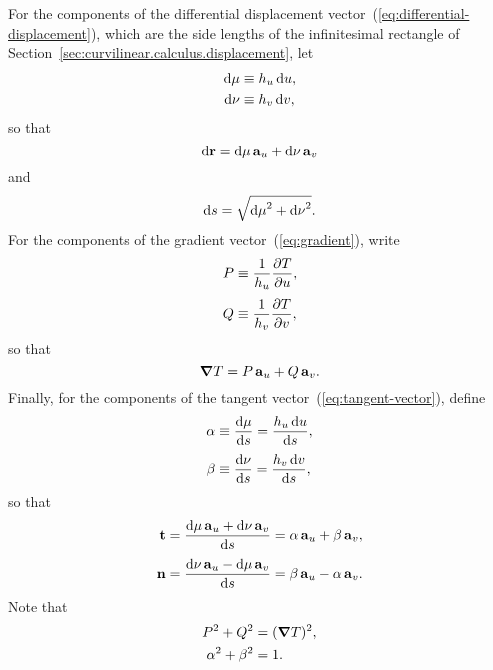 For the components of the differential displacement
vector~(\ref{eq:differential-displacement}),
which are the side lengths of the infinitesimal rectangle
of Section~\ref{sec:curvilinear.calculus.displacement},
let
\begin{align}
  \td \mu &\defeq \scalefac[u] \td u,
    \label{eq:differential-displacement-u-component} \\
  \td \nu &\defeq \scalefac[v] \td v,
    \label{eq:differential-displacement-v-component}
\end{align}
so that
\begin{equation}
  \mathop{}\!\mathrm{d} \boldsymbol{\mathrm{r}} = \mathop{}\!\mathrm{d} \mu \mathop{}\!\boldsymbol{\mathrm{a}}_{u} + \mathop{}\!\mathrm{d} \nu \mathop{}\!\boldsymbol{\mathrm{a}}_{v}
  \label{eq:differential-displacement-abbreviated}
\end{equation}
and
\begin{equation}
  \mathop{}\!\mathrm{d} s = \sqrt{{\mathop{}\!\mathrm{d} \mu}^2 + {\mathop{}\!\mathrm{d} \nu}^2}.
  \label{eq:differential-arc-length-abbreviated}
\end{equation}
For the components of the gradient vector~(\ref{eq:gradient}),
write
\begin{align}
  P &\defeq \frac{1}{\scalefac[u]} \pder{T}{u},
    \label{eq:gradient-u-component} \\[\fraclinespace]
  Q &\defeq \frac{1}{\scalefac[v]} \pder{T}{v},
    \label{eq:gradient-v-component}
\end{align}
so that
\begin{equation}
  \mathop{}\!\boldsymbol{\mathrm{\nabla}} T = P \mathop{}\!\boldsymbol{\mathrm{a}}_{u} + Q \mathop{}\!\boldsymbol{\mathrm{a}}_{v}.
  \label{eq:gradient-abbreviated}
\end{equation}
Finally, for the components of
the tangent vector~(\ref{eq:tangent-vector}), define
\begin{align}
  \alpha &\defeq \tder{\mu}{s} = \frac{\scalefac[u] \td u}{\td s},
    \label{eq:tangent-u-component} \\[\fraclinespace]
  \beta &\defeq \tder{\nu}{s} = \frac{\scalefac[v] \td v}{\td s},
    \label{eq:tangent-v-component}
\end{align}
so that
\begin{align}
  \tangentvec
  &= \frac{\td \mu \basisvec{u} + \td \nu \basisvec{v}}{\td s}
  = \alpha \basisvec{u} + \beta \basisvec{v},
    \label{eq:tangent-vector-abbreviated} \\[\fraclinespace]
  \normalvec
  &= \frac{\td \nu \basisvec{u} - \td \mu \basisvec{v}}{\td s}
  = \beta \basisvec{u} - \alpha \basisvec{v}.
    \label{eq:normal-vector-abbreviated}
\end{align}
Note that
\begin{align}
  P^2 + Q^2 &= (\mathop{}\!\boldsymbol{\mathrm{\nabla}} T)^2, \label{eq:gradient-pythagoras} \\
  \alpha^2 + \beta^2 &= 1. \label{eq:tangent-pythagoras}
\end{align}


